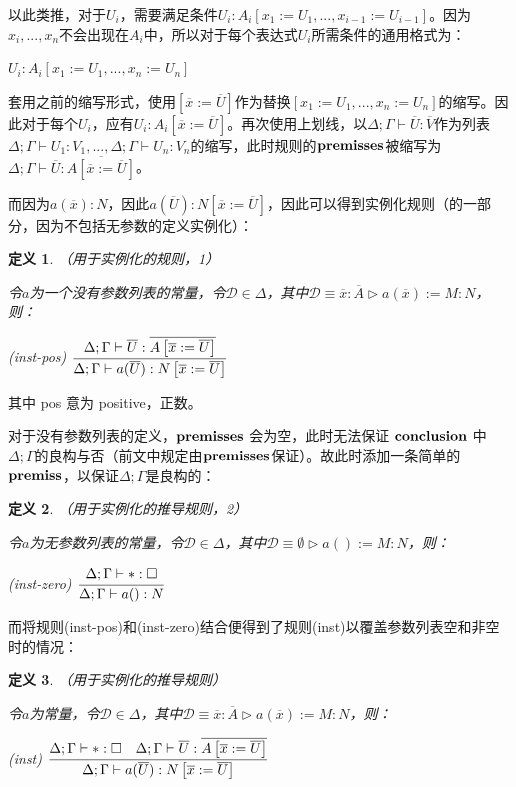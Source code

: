 \documentclass[UTF8]{article}
\newtheorem{thm}{定义}[section]
\begin{document}
		以此类推，对于$U_i$，需要满足条件$U_i:A_i\left[x_1:=U_1,...,x_{i-1}:=U_{i-1}\right]$。因为$x_i,...,x_n$不会出现在$A_i$中，所以对于每个表达式$U_i$所需条件的通用格式为：
		
		$U_i:A_i\left[x_1:=U_1,...,x_n:=U_n\right]$
		
		套用之前的缩写形式，使用$\left[\overline{x}:=\overline{U}\right]$作为替换$\left[x_1:=U_1,...,x_n:=U_n\right]$的缩写。因此对于每个$U_i$，应有$U_i:A_i\left[\overline{x}:=\overline{U}\right]$。再次使用上划线，以$\Delta;\Gamma\vdash\overline{U}:\overline{V}$作为列表$\Delta;\Gamma\vdash U_1:V_1,...,\Delta;\Gamma\vdash U_n:V_n$的缩写，此时规则的$\bf premisses$被缩写为$\Delta;\Gamma\vdash\overline{U}:\overline{A\left[\overline{x}:=\overline{U}\right]}$。
		
		而因为$a(\overline{x}):N$，因此$a(\overline{U}):N\left[\overline{x}:=\overline{U}\right]$，因此可以得到实例化规则（的一部分，因为不包括无参数的定义实例化）：
		
		\begin{thm}（用于实例化的规则，1）
			
			\noindent
			令$a$为一个没有参数列表的常量，令$\mathcal{D}\in\Delta$，其中$\mathcal{D}\equiv\overline{x}:\overline{A}\triangleright a(\overline{x}):=M:N$，则：
			
			(inst-pos) $\cfrac{\Delta;\Gamma\vdash\overline{U}:\overline{A\left[\overline{x}:=\overline{U}\right]}}{\Delta;\Gamma\vdash a(\overline{U}):N\left[\overline{x}:=\overline{U}\right]}$
		\end{thm}
	
		其中 pos 意为 positive，正数。
		
		对于没有参数列表的定义，$\bf premisses$ 会为空，此时无法保证 $\bf conclusion$ 中$\Delta;\Gamma$的良构与否（前文中规定由$\bf premisses$保证）。故此时添加一条简单的$\bf premiss$，以保证$\Delta;\Gamma$是良构的：
		
		\begin{thm}（用于实例化的推导规则，2）
			
			\noindent
			令$a$为无参数列表的常量，令$\mathcal{D}\in\Delta$，其中$\mathcal{D}\equiv\emptyset\triangleright a():=M:N$，则：
			
			(inst-zero) $\cfrac{\Delta;\Gamma\vdash*:\square}{\Delta;\Gamma\vdash a():N}$
		\end{thm}
	
		而将规则(inst-pos)和(inst-zero)结合便得到了规则(inst)以覆盖参数列表空和非空时的情况：
		
		\begin{thm}（用于实例化的推导规则）
			
			\noindent
			令$a$为常量，令$\mathcal{D}\in\Delta$，其中$\mathcal{D}\equiv\overline{x}:\overline{A}\triangleright a(\overline{x}):=M:N$，则：
			
			(inst) $\cfrac{\Delta;\Gamma\vdash*:\square\ \ \ \Delta;\Gamma\vdash\overline{U}:\overline{A\left[\overline{x}:=\overline{U}\right]}}{\Delta;\Gamma\vdash a(\overline{U}):N\left[\overline{x}:=\overline{U}\right]}$
		\end{thm}
\end{document}

